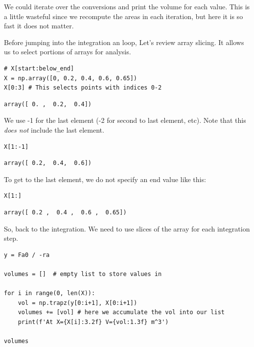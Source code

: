\documentclass[11pt]{article}
\begin{document}
\begin{enumerate}
We could iterate over the conversions and print the volume for each value. This is a little wasteful since we recompute the areas in each iteration, but here it is so fast it does not matter.

Before jumping into the integration an loop, Let's review array slicing. It allows us to select portions of arrays for analysis.

\begin{verbatim}
# X[start:below_end]
X = np.array([0, 0.2, 0.4, 0.6, 0.65])
X[0:3] # This selects points with indices 0-2
\end{verbatim}

\begin{verbatim}
array([ 0. ,  0.2,  0.4])
\end{verbatim}

We use -1 for the last element (-2 for second to last element, etc). Note that this \emph{does not} include the last element.

\begin{verbatim}
X[1:-1]
\end{verbatim}

\begin{verbatim}
array([ 0.2,  0.4,  0.6])
\end{verbatim}

To get to the last element, we do not specify an end value like this:

\begin{verbatim}
X[1:]
\end{verbatim}

\begin{verbatim}
array([ 0.2 ,  0.4 ,  0.6 ,  0.65])
\end{verbatim}

So, back to the integration. We need to use slices of the array for each integration step.

\begin{verbatim}
y = Fa0 / -ra

volumes = []  # empty list to store values in

for i in range(0, len(X)):
    vol = np.trapz(y[0:i+1], X[0:i+1])
    volumes += [vol] # here we accumulate the vol into our list
    print(f'At X={X[i]:3.2f} V={vol:1.3f} m^3')

volumes
\end{verbatim}


\end{enumerate}
\end{document}
